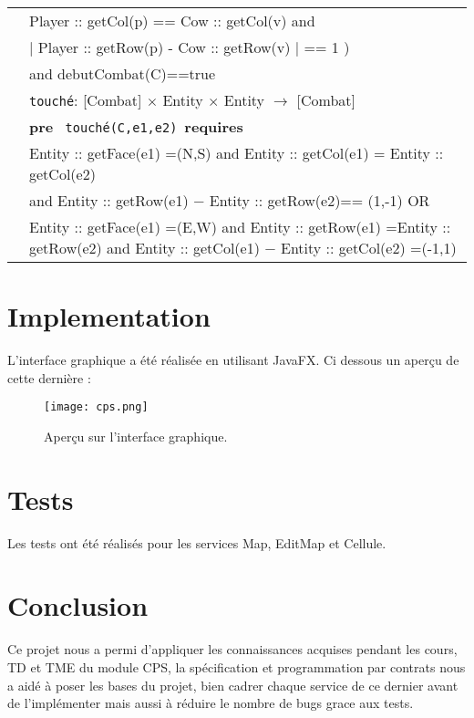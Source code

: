 \documentclass{article}
\begin{document}
\begin{tabular}{rl}
&\quad \quad \quad Player :: getCol(p) == Cow :: getCol(v) and\\
&\quad \quad \quad $|$ Player :: getRow(p) - Cow :: getRow(v) $|$ == 1 ) \\
&\quad \quad \quad and debutCombat(C)==true \\

& \texttt{touché}: \textrm{[Combat]} $\times$ Entity $\times$ Entity $\rightarrow$ \textrm{[Combat]} \\
& \quad\quad \textbf{pre}~
\texttt{touché(C,e1,e2)}~\textbf{requires}~ \\
&\quad \quad \quad Entity :: getFace(e1) =(N,S) and Entity :: getCol(e1) = Entity :: getCol(e2) \\
&\quad \quad \quad and Entity :: getRow(e1) $-$ Entity :: getRow(e2)== (1,-1) OR
\\
& \quad \quad \quad Entity :: getFace(e1) =(E,W) and Entity :: getRow(e1) =Entity :: getRow(e2) and Entity :: getCol(e1) $-$ Entity :: getCol(e2) =(-1,1)



\end{tabular}

\newpage
\section{Implementation}
L'interface graphique a été réalisée en utilisant JavaFX.
Ci dessous un aperçu de cette dernière : 
\begin{figure}[!h]
    \centering
    \texttt{[image: cps.png]}
    \caption{Aperçu sur l'interface graphique.}
    \label{BDDexple}
\end{figure}
\paragraph{}

\newpage
\section{Tests}
Les tests ont été réalisés pour les services Map, EditMap et Cellule.
\paragraph{}

\section{Conclusion}
Ce projet nous a permi d'appliquer les connaissances acquises pendant les cours, TD et TME du module CPS, la spécification et programmation par contrats nous a aidé à poser les bases du projet, bien cadrer chaque service de ce dernier avant de l'implémenter mais aussi à réduire le nombre de bugs grace aux tests.
\end{document}
